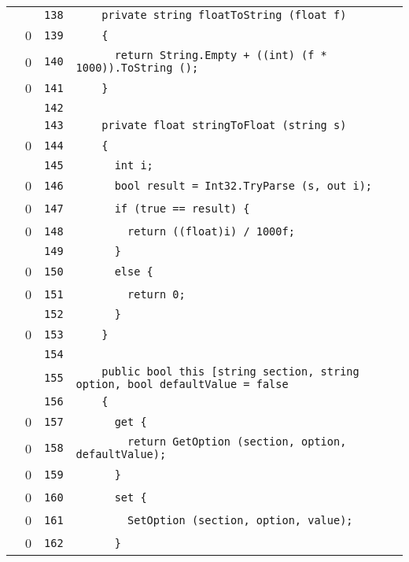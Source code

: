 \documentclass[a4paper,10pt]{article}
\begin{document}
\begin{longtable}[l]{lrrl}
\cellcolor{gray} &  & \verb~138~ & \verb~    private string floatToString (float f)~\\
\cellcolor{red} & 0 & \verb~139~ & \verb~    {~\\
\cellcolor{red} & 0 & \verb~140~ & \verb~      return String.Empty + ((int) (f * 1000)).ToString ();~\\
\cellcolor{red} & 0 & \verb~141~ & \verb~    }~\\
\cellcolor{gray} &  & \verb~142~ & \verb~~\\
\cellcolor{gray} &  & \verb~143~ & \verb~    private float stringToFloat (string s)~\\
\cellcolor{red} & 0 & \verb~144~ & \verb~    {~\\
\cellcolor{gray} &  & \verb~145~ & \verb~      int i;~\\
\cellcolor{red} & 0 & \verb~146~ & \verb~      bool result = Int32.TryParse (s, out i);~\\
\cellcolor{red} & 0 & \verb~147~ & \verb~      if (true == result) {~\\
\cellcolor{red} & 0 & \verb~148~ & \verb~        return ((float)i) / 1000f;~\\
\cellcolor{gray} &  & \verb~149~ & \verb~      }~\\
\cellcolor{red} & 0 & \verb~150~ & \verb~      else {~\\
\cellcolor{red} & 0 & \verb~151~ & \verb~        return 0;~\\
\cellcolor{gray} &  & \verb~152~ & \verb~      }~\\
\cellcolor{red} & 0 & \verb~153~ & \verb~    }~\\
\cellcolor{gray} &  & \verb~154~ & \verb~~\\
\cellcolor{gray} &  & \verb~155~ & \verb~    public bool this [string section, string option, bool defaultValue = false~\\
\cellcolor{gray} &  & \verb~156~ & \verb~    {~\\
\cellcolor{red} & 0 & \verb~157~ & \verb~      get {~\\
\cellcolor{red} & 0 & \verb~158~ & \verb~        return GetOption (section, option, defaultValue);~\\
\cellcolor{red} & 0 & \verb~159~ & \verb~      }~\\
\cellcolor{red} & 0 & \verb~160~ & \verb~      set {~\\
\cellcolor{red} & 0 & \verb~161~ & \verb~        SetOption (section, option, value);~\\
\cellcolor{red} & 0 & \verb~162~ & \verb~      }~\\

\end{longtable}
\end{document}
